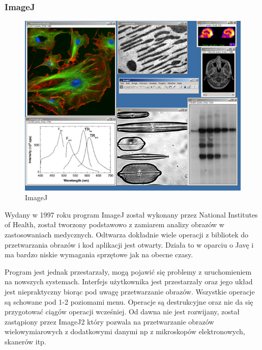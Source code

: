 \subsubsection{ImageJ}
\begin{figure}[H]
    \centering
    \includegraphics[width=0.8\linewidth]{./images/Picture3.png}
    \caption{ImageJ}
    \label{fig:imagej}
\end{figure}
Wydany w 1997 roku program ImageJ został wykonany przez National Institutes of Health, został tworzony podstawowo z zamiarem analizy obrazów w zastosowaniach medycznych. 
Odtwarza dokładnie wiele operacji z bibliotek do przetwarzania obrazów i kod aplikacji jest otwarty. 
Działa to w oparciu o Javę i ma bardzo niskie wymagania sprzętowe jak na obecne czasy.

Program jest jednak przestarzały, mogą pojawić się problemy z uruchomieniem na nowszych systemach. Interfejs użytkownika jest przestarzały oraz jego układ jest niepraktyczny biorąc pod uwagę przetwarzanie obrazów. 
Wszystkie operacje są schowane pod 1-2 poziomami menu. Operacje są destrukcyjne oraz nie da się przygotować ciągów operacji wcześniej. 
Od dawna nie jest rozwijany, został zastąpiony przez ImageJ2 który pozwala na przetwarzanie obrazów wielowymiarowych z dodatkowymi danymi np z mikroskopów elektronowych, skanerów itp.

